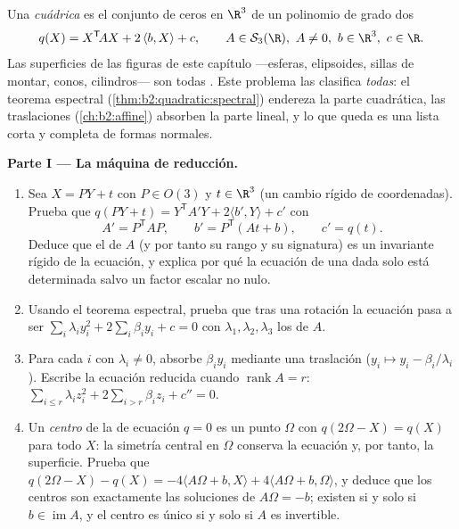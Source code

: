 \begin{problem}\label{pb:b2:surfaces:1}
Una \emph{cuádrica} es el conjunto de ceros en $\R^3$
de un polinomio de grado dos
\[
q(X) = X^{\mathsf T}\!AX + 2\,\langle b, X\rangle + c,
\qquad A \in \mathcal S_3(\R),\ A \neq 0,\ b \in \R^3,\
c \in \R .
\]
Las superficies de las figuras de este capítulo ---esferas,
elipsoides, sillas de montar, conos, cilindros--- son todas
. Este problema las clasifica \emph{todas}: el teorema
espectral (\cref{thm:b2:quadratic:spectral}) endereza la parte
cuadrática, las traslaciones  (\cref{ch:b2:affine}) absorben la
parte lineal, y lo que queda es una lista corta y completa de formas
normales.

\medskip
\noindent\textbf{Parte I --- La máquina de reducción.}
\begin{enumerate}
  \item Sea $X = PY + t$ con $P \in O(3)$ y $t \in \R^3$ (un cambio
        rígido de coordenadas). Prueba que $q(PY + t) = Y^{\mathsf
        T}\!A'Y + 2\langle b', Y\rangle + c'$ con
        \[
        A' = P^{\mathsf T}\!AP, \qquad
        b' = P^{\mathsf T}(At + b), \qquad
        c' = q(t) .
        \]
        Deduce que el  de $A$ (y por tanto su rango y su
        signatura) es un invariante rígido de la ecuación, y explica
        por qué la ecuación de una  dada solo está
        determinada salvo un factor escalar no nulo.
  \item Usando el teorema espectral, prueba que tras una rotación la
        ecuación pasa a ser $\sum_i \lambda_i y_i^2 +
        2\sum_i\beta_iy_i + c = 0$ con $\lambda_1, \lambda_2,
        \lambda_3$ los  de $A$.
  \item Para cada $i$ con $\lambda_i \neq 0$, absorbe $\beta_iy_i$
        mediante una traslación ($y_i \mapsto y_i -
        \beta_i/\lambda_i$). Escribe la ecuación reducida cuando
        $\operatorname{rank} A = r$: $\sum_{i\leq r}\lambda_i z_i^2 +
        2\sum_{i > r}\beta_iz_i + c'' = 0$.
  \item Un \emph{centro} de la  de ecuación $q = 0$ es un
        punto $\Omega$ con $q(2\Omega - X) = q(X)$ para todo $X$: la
        simetría central en $\Omega$ conserva la ecuación y, por
        tanto, la superficie. Prueba que $q(2\Omega - X) - q(X) =
        -4\langle A\Omega + b, X\rangle + 4\langle A\Omega + b,
        \Omega\rangle$, y deduce que los centros son exactamente las
        soluciones de $A\Omega = -b$; existen si y solo si $b \in
        \operatorname{im}A$, y el centro es único si y solo si $A$ es
        invertible.
\end{enumerate}


\end{problem}
